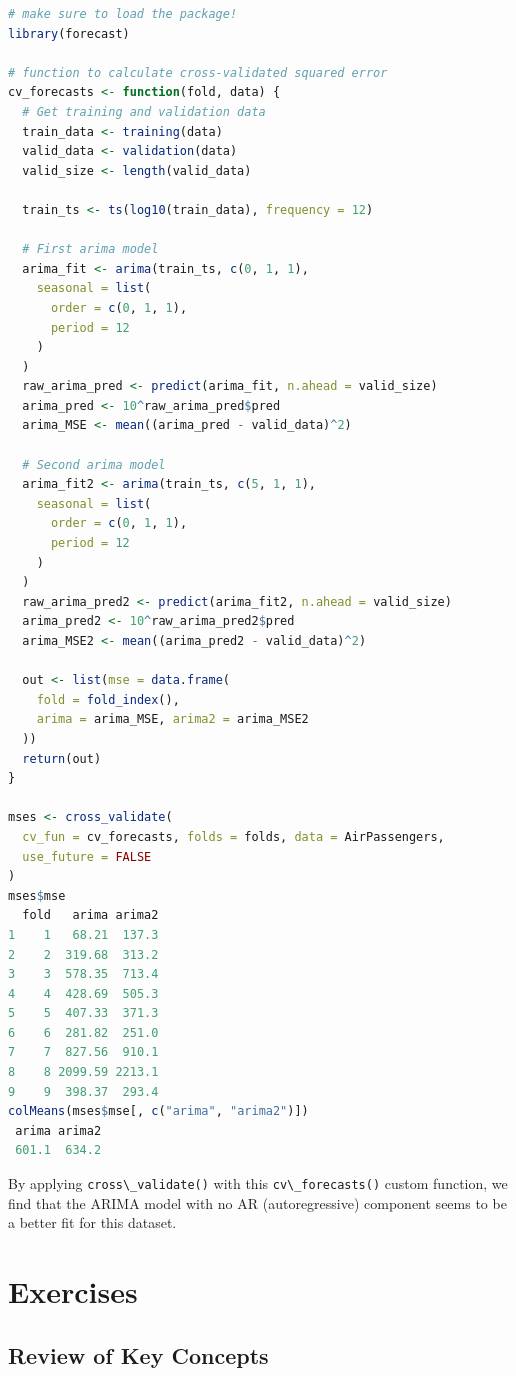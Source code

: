 \documentclass[
  12pt, krantz2,
]{krantz}
\newcommand{\passthrough}[1]{#1}
\newcommand{\1}{\mathbbm{1}}
\theoremstyle{definition}
\theoremstyle{definition}
\theoremstyle{definition}
\theoremstyle{definition}
\theoremstyle{remark}
\begin{document}
\begin{lstlisting}[language=R]
# make sure to load the package!
library(forecast)

# function to calculate cross-validated squared error
cv_forecasts <- function(fold, data) {
  # Get training and validation data
  train_data <- training(data)
  valid_data <- validation(data)
  valid_size <- length(valid_data)

  train_ts <- ts(log10(train_data), frequency = 12)

  # First arima model
  arima_fit <- arima(train_ts, c(0, 1, 1),
    seasonal = list(
      order = c(0, 1, 1),
      period = 12
    )
  )
  raw_arima_pred <- predict(arima_fit, n.ahead = valid_size)
  arima_pred <- 10^raw_arima_pred$pred
  arima_MSE <- mean((arima_pred - valid_data)^2)

  # Second arima model
  arima_fit2 <- arima(train_ts, c(5, 1, 1),
    seasonal = list(
      order = c(0, 1, 1),
      period = 12
    )
  )
  raw_arima_pred2 <- predict(arima_fit2, n.ahead = valid_size)
  arima_pred2 <- 10^raw_arima_pred2$pred
  arima_MSE2 <- mean((arima_pred2 - valid_data)^2)

  out <- list(mse = data.frame(
    fold = fold_index(),
    arima = arima_MSE, arima2 = arima_MSE2
  ))
  return(out)
}

mses <- cross_validate(
  cv_fun = cv_forecasts, folds = folds, data = AirPassengers,
  use_future = FALSE
)
mses$mse
  fold   arima arima2
1    1   68.21  137.3
2    2  319.68  313.2
3    3  578.35  713.4
4    4  428.69  505.3
5    5  407.33  371.3
6    6  281.82  251.0
7    7  827.56  910.1
8    8 2099.59 2213.1
9    9  398.37  293.4
colMeans(mses$mse[, c("arima", "arima2")])
 arima arima2 
 601.1  634.2 
\end{lstlisting}

By applying \passthrough{\lstinline!cross\_validate()!} with this \passthrough{\lstinline!cv\_forecasts()!} custom function, we
find that the ARIMA model with no AR (autoregressive) component seems to be a
better fit for this dataset.

\hypertarget{exercises}{%
\section{Exercises}\label{exercises}}

\hypertarget{review-of-key-concepts}{%
\subsection{Review of Key Concepts}\label{review-of-key-concepts}}
\end{document}
